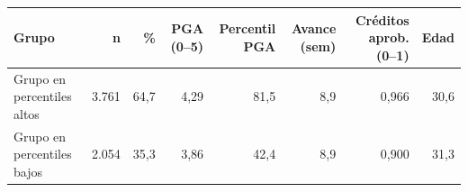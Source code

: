 \begin{tabular}{lrrrrrrr}
\toprule
\textbf{Grupo} & \textbf{n} & \textbf{\%} & \textbf{PGA (0–5)} & \textbf{Percentil PGA} & \textbf{Avance (sem)} & \textbf{Créditos aprob. (0–1)} & \textbf{Edad} \\
\midrule
Grupo en percentiles altos & 3.761 & 64,7 & 4,29 & 81,5 & 8,9 & 0,966 & 30,6 \\
Grupo en percentiles bajos & 2.054 & 35,3 & 3,86 & 42,4 & 8,9 & 0,900 & 31,3 \\
\bottomrule
\end{tabular}